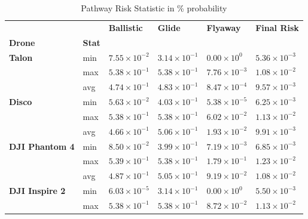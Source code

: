 \documentclass[12pt]{report}
\begin{document}
        \begin{table}[H]
            \centering
            \caption{Pathway Risk Statistic in \% probability} %
            \begin{tabular}{|l l l l l l |}
                \hline
                      &  & \textbf{Ballistic} & \textbf{Glide} & \textbf{Flyaway} & \textbf{Final Risk} \\
                \textbf{Drone} & \textbf{Stat}  &  &  &  &  \\
                \hline
                \textbf{Talon} & min & \(7.55 \times 10^{-2}\) & \(3.14 \times 10^{-1}\) & \(0.00 \times 10^{0}\) & \(5.36 \times 10^{-3}\) \\
                               & max & \(5.38 \times 10^{-1}\) & \(5.38 \times 10^{-1}\) & \(7.76 \times 10^{-3}\) & \(1.08 \times 10^{-2}\) \\
                               & avg & \(4.74 \times 10^{-1}\) & \(4.83 \times 10^{-1}\) & \(8.47 \times 10^{-4}\) & \(9.57 \times 10^{-3}\) \\
                \hline
                \textbf{Disco} & min & \(5.63 \times 10^{-2}\) & \(4.03 \times 10^{-1}\) & \(5.38 \times 10^{-5}\) & \(6.25 \times 10^{-3}\) \\
                               & max & \(5.38 \times 10^{-1}\) & \(5.38 \times 10^{-1}\) & \(6.02 \times 10^{-2}\) & \(1.13 \times 10^{-2}\) \\
                               & avg & \(4.66 \times 10^{-1}\) & \(5.06 \times 10^{-1}\) & \(1.93 \times 10^{-2}\) & \(9.91 \times 10^{-3}\) \\
                \hline
                \textbf{DJI Phantom 4} & min & \(8.50 \times 10^{-2}\) & \(3.99 \times 10^{-1}\) & \(7.19 \times 10^{-3}\) & \(6.85 \times 10^{-3}\) \\
                                        & max & \(5.39 \times 10^{-1}\) & \(5.38 \times 10^{-1}\) & \(1.79 \times 10^{-1}\) & \(1.23 \times 10^{-2}\) \\
                                        & avg & \(4.87 \times 10^{-1}\) & \(5.05 \times 10^{-1}\) & \(9.19 \times 10^{-2}\) & \(1.08 \times 10^{-2}\) \\
                \hline
                \textbf{DJI Inspire 2} & min & \(6.03 \times 10^{-5}\) & \(3.14 \times 10^{-1}\) & \(0.00 \times 10^{0}\) & \(5.50 \times 10^{-3}\) \\
                                        & max & \(5.38 \times 10^{-1}\) & \(5.38 \times 10^{-1}\) & \(8.72 \times 10^{-2}\) & \(1.13 \times 10^{-2}\) \\

\end{tabular}
\end{table}
\end{document}
